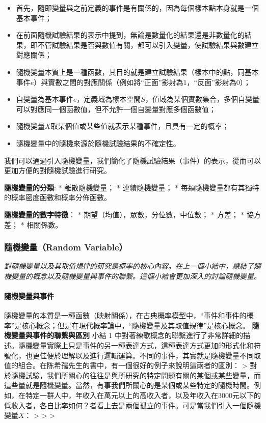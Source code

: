 \documentclass[11pt]{article}
\providecommand{\tightlist}{%
      \setlength{\itemsep}{0pt}\setlength{\parskip}{0pt}}
\begin{document}
\begin{itemize}
\tightlist
\item
  首先，隨即變量與之前定義的事件是有關係的，因為每個樣本點本身就是一個基本事件；
\item
  在前面隨機試驗結果的表示中提到，無論是數量化的結果還是非數量化的結果，即不管試驗結果是否與數值有關，都可以引入變量，使試驗結果與數建立對應關係；
\item
  隨機變量本質上是一種函數，其目的就是建立試驗結果（樣本中的點，同基本事件\(e\)）與實數之間的對應關係（例如將``正面''影射為\(1\)，``反面''影射為\(0\)）；
\item
  自變量為基本事件\(e\)，定義域為樣本空間\(S\)，值域為某個實數集合，多個自變量可以對應同一個函數值，但不允許一個自變量對應多個函數值；
\item
  隨機變量\(X\)取某個值或某些值就表示某種事件，且具有一定的概率；
\item
  隨機變量中的隨機來源於隨機試驗結果的不確定性。
\end{itemize}

    我們可以通過引入隨機變量，我們簡化了隨機試驗結果（事件）的表示，從而可以更加方便的對隨機試驗進行研究。

    \textbf{隨機變量的分類}: * 離散隨機變量； * 連續隨機變量； *
每類隨機變量都有其獨特的概率密度函數和概率分佈函數。

\textbf{隨機變量的數字特徵}： * 期望（均值），眾數，分位數，中位數； *
方差； * 協方差； * 相關係數。

    \hypertarget{ux96a8ux6a5fux8b8aux91cfrandom-variable}{%
\subsubsection{隨機變量（Random
Variable）}\label{ux96a8ux6a5fux8b8aux91cfrandom-variable}}

\emph{對隨機變量以及其取值規律的研究是概率的核心內容。在上一個小結中，總結了隨機變量的概念以及隨機變量與事件的聯繫。這個小結會更加深入的討論隨機變量。}

\hypertarget{ux96a8ux6a5fux8b8aux91cfux8207ux4e8bux4ef6}{%
\paragraph{隨機變量與事件}\label{ux96a8ux6a5fux8b8aux91cfux8207ux4e8bux4ef6}}

隨機變量的本質是一種函數（映射關係），在古典概率模型中，``事件和事件的概率''是核心概念；但是在現代概率論中，``隨機變量及其取值規律''是核心概念。
\textbf{隨機變量與事件的聯繫與區別} 小結 1
中對著練歌概念的聯繫進行了非常詳細的描述。隨機變量實際上只是事件的另一種表達方式，這種表達方式更加的形式化和符號化，也更佳便於理解以及進行邏輯運算。不同的事件，其實就是隨機變量不同取值的組合。在陈希孺先生的書中，有一個很好的例子來說明這兩者的區別：
\textgreater{}
對於隨機試驗，我們所關心的往往是與所研究的特定問題有關的某個或某些變量，而這些量就是隨機變量。當然，有事我們所關心的是某個或某些特定的隨機時間。例如，在特定一群人中，年收入在萬元以上的高收入者，以及年收入在\(3000\)元以下的低收入者，各自比率如何？者看上去是兩個孤立的事件。可是當我們引入一個隨機變量\(X\)：
\textgreater{} \textgreater{} \textgreater{}
\end{document}
